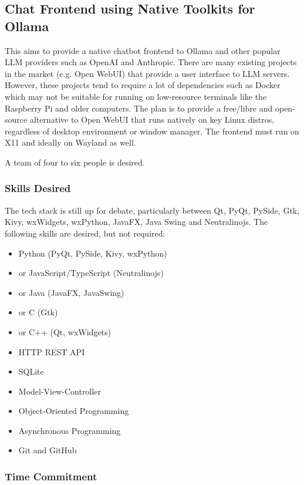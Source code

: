 \documentclass[../proposal-for-projects-2025.tex]{subfiles}
\begin{document}
\subsection{Chat Frontend using Native Toolkits for Ollama}

This aims to provide a native chatbot frontend to Ollama and other popular LLM providers such as OpenAI and Anthropic.  There are many existing projects in the market (e.g. Open WebUI) that provide a user interface to LLM servers.  However, these projects tend to require a lot of dependencies such as Docker which may not be suitable for running on low-resource terminals like the Raspberry Pi and older computers.  The plan is to provide a free/libre and open-source alternative to Open WebUI that runs natively on key Linux distros, regardless of desktop environment or window manager.  The frontend must run on X11 and ideally on Wayland as well.

A team of four to six people is desired.

\subsubsection*{Skills Desired}

The tech stack is still up for debate, particularly between Qt, PyQt, PySide, Gtk, Kivy, wxWidgets, wxPython, JavaFX, Java Swing and Neutralinojs.  The following skills are desired, but not required:

\begin{multicols}{2}
\begin{itemize}
    \item Python (PyQt, PySide, Kivy, wxPython)
    \item or JavaScript/TypeScript (Neutralinojs)
    \item or Java (JavaFX, JavaSwing)
    \item or C (Gtk)
    \item or C++ (Qt, wxWidgets)
    \item HTTP REST API
    \item SQLite
    \item Model-View-Controller
    \item Object-Oriented Programming
    \item Asynchronous Programming
    \item Git and GitHub
\end{itemize}
\end{multicols}

\subsubsection*{Time Commitment}
\end{document}
